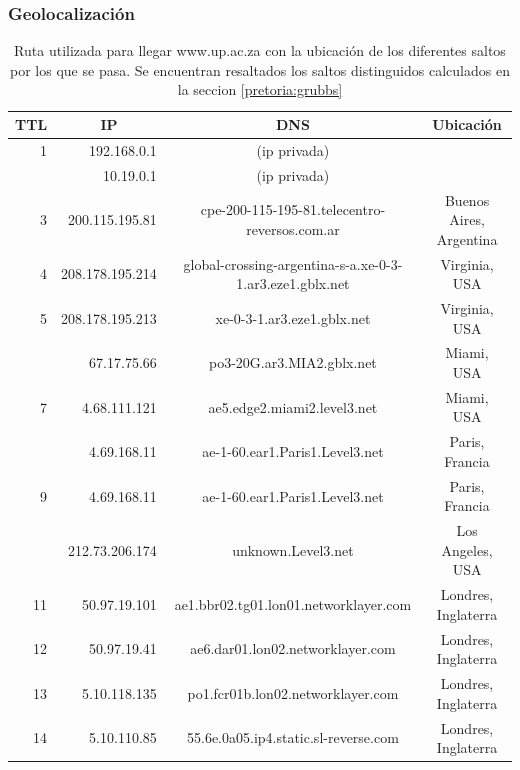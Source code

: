 \subsubsection{Geolocalización}

\begin{table}[H]
    \begin{center}
        \begin{tabular}{| r | r | c | c |}
  \hline
  {\bf TTL} & \multicolumn{1}{|c|}{\bf IP} & {\bf DNS} & {\bf Ubicación}\\
  \hline
\hline 1  & 192.168.0.1 & (ip privada) & \\
\rowcolor{blue!25}\hline 2  & 10.19.0.1 & (ip privada) & \\
\hline 3  & 200.115.195.81 & cpe-200-115-195-81.telecentro-reversos.com.ar & Buenos Aires, Argentina\\
\hline 4  & 208.178.195.214 & global-crossing-argentina-s-a.xe-0-3-1.ar3.eze1.gblx.net & Virginia, USA\\ 
\hline 5  & 208.178.195.213 & xe-0-3-1.ar3.eze1.gblx.net & Virginia, USA\\ 
\rowcolor{blue!25}\hline 6  & 67.17.75.66 &  po3-20G.ar3.MIA2.gblx.net & Miami, USA\\ 
\hline 7  & 4.68.111.121 &  ae5.edge2.miami2.level3.net  & Miami, USA\\ 
\rowcolor{blue!25}\hline 8  & 4.69.168.11 & ae-1-60.ear1.Paris1.Level3.net & Paris, Francia\\ 
\hline 9  & 4.69.168.11 & ae-1-60.ear1.Paris1.Level3.net & Paris, Francia\\ 
\rowcolor{blue!25}\hline 10  & 212.73.206.174 & unknown.Level3.net & Los Angeles, USA\\ 
\hline 11  & 50.97.19.101 & ae1.bbr02.tg01.lon01.networklayer.com & Londres, Inglaterra\\ 
\hline 12  & 50.97.19.41 & ae6.dar01.lon02.networklayer.com & Londres, Inglaterra\\ 
\hline 13  & 5.10.118.135 & po1.fcr01b.lon02.networklayer.com & Londres, Inglaterra\\ 
\hline 14  & 5.10.110.85 &  55.6e.0a05.ip4.static.sl-reverse.com & Londres, Inglaterra\\ 
\hline
        \end{tabular}
        \caption{Ruta utilizada para llegar www.up.ac.za con la ubicación de los diferentes saltos por los que se pasa. Se encuentran resaltados los saltos distinguidos calculados en la seccion \ref{pretoria:grubbs}}
        \label{table:pretoria} 
    \end{center}
\end{table}


